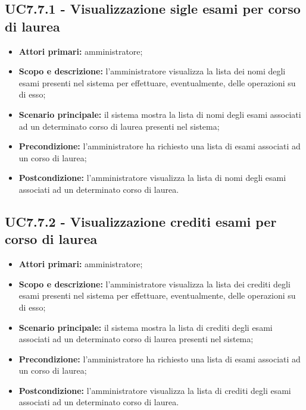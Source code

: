 \documentclass[AnalisiDeiRequisiti.tex]{subfiles}
\begin{document}
\subsection{UC7.7.1 - Visualizzazione sigle esami per corso di laurea}
\begin{itemize}
	\item \textbf{Attori primari:} amministratore;
	\item \textbf{Scopo e descrizione:} l'amministratore visualizza la lista dei nomi degli esami presenti nel sistema per effettuare, eventualmente, delle operazioni su di esso;
	\item \textbf{Scenario principale:} il sistema mostra la lista di nomi degli esami associati ad un determinato corso di laurea presenti nel sistema;
	\item \textbf{Precondizione:} l'amministratore ha richiesto una lista di esami associati ad un corso di laurea; 
	\item \textbf{Postcondizione:} l'amministratore visualizza la lista di nomi degli esami associati ad un determinato corso di laurea.
\end{itemize}
\subsection{UC7.7.2 - Visualizzazione crediti esami per corso di laurea}
\begin{itemize}
	\item \textbf{Attori primari:} amministratore;
	\item \textbf{Scopo e descrizione:} l'amministratore visualizza la lista dei crediti degli esami presenti nel sistema per effettuare, eventualmente, delle operazioni su di esso;
	\item \textbf{Scenario principale:} il sistema mostra la lista di crediti degli esami associati ad un determinato corso di laurea presenti nel sistema;
	\item \textbf{Precondizione:} l'amministratore ha richiesto una lista di esami associati ad un corso di laurea; 
	\item \textbf{Postcondizione:} l'amministratore visualizza la lista di crediti degli esami associati ad un determinato corso di laurea.
\end{itemize}
\end{document}

